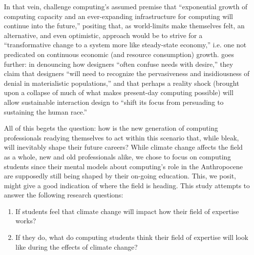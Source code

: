 In that vein, \citet{nardiComputingLimits2018} challenge computing's assumed premise that ``exponential growth of computing capacity and an ever-expanding infrastructure for computing will continue into the future,'' positing that, as world-limits make themselves felt, an alternative, and even optimistic, approach would be to strive for a ``transformative change to a system more like steady-state economy,'' i.e. one not predicated on continuous economic (and resource consumption) growth. 
\citet{wong2009prepare} goes further: in denouncing how designers ``often confuse needs with desire,'' they claim that designers ``will need to recognize the pervasiveness and insidiousness of denial in materialistic populations,'' and that perhaps a reality shock (brought upon a collapse of much of what makes present-day computing possible) will allow sustainable interaction design to ``shift its focus from persuading to sustaining the human race.''

All of this begets the question: how is the new generation of computing professionals readying themselves to act within this scenario that, while bleak, will inevitably shape their future careers? While climate change affects the field as a whole, new and old professionals alike, we chose to focus on computing students since their mental models about computing's role in the Anthropocene are supposedly still being shaped by their on-going education. This, we posit, might give a good indication of where the field is heading. This study attempts to answer the following research questions:

\begin{enumerate}
    \item If students feel that climate change will impact how their field of expertise works?
    \item If they do, what do computing students think their field of expertise will look like during the effects of climate change?
\end{enumerate}